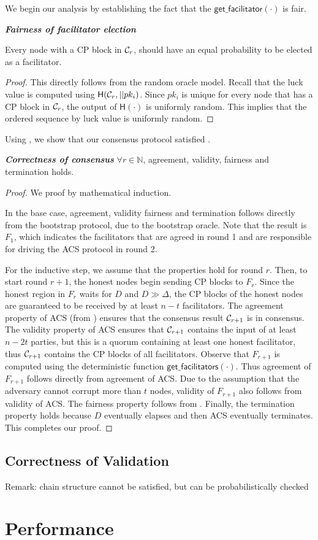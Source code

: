 We begin our analysis by establishing the fact that the $\textsf{get\_facilitator}(\cdot)$ is fair.
\begin{lemma}
\label{lemma:fairness}
\textbf{\emph{Fairness of facilitator election}}

Every node with a CP block in $\mathcal{C}_r$, should have an equal probability to be elected as a facilitator.
\end{lemma}
\begin{proof}
This directly follows from the random oracle model.
Recall that the luck value is computed using $\textsf{H}(\mathcal{C}_r, || pk_i)$.
Since $pk_i$ is unique for every node that has a CP block in $\mathcal{C}_r$, the output of $\textsf{H}(\cdot)$ is uniformly random.
This implies that the ordered sequence by luck value is uniformly random.
\end{proof}


Using , we show that our consensus protocol satisfied .
\begin{lemma}
\textbf{\emph{Correctness of consensus}}
$\forall r \in \mathbb{N}$, agreement, validity, fairness and termination holds.
\end{lemma}

\begin{proof}
We proof by mathematical induction.

In the base case, agreement, validity fairness and termination follows directly from the bootstrap protocol, due to the bootstrap oracle.
Note that the result is $F_1$, which indicates the facilitators that are agreed in round 1 and are responsible for driving the ACS protocol in round 2.

For the inductive step, we assume that the properties hold for round $r$.
Then, to start round $r + 1$, the honest nodes begin sending CP blocks to $F_r$. %
Since the honest region in $F_r$ waits for $D$ and $D \gg \Delta$,
the CP blocks of the honest nodes are guaranteed to be received by at least $n - t$ facilitators.
The agreement property of ACS (from ) ensures that the consensus result $\mathcal{C}_{r + 1}$ is in consensus. 
The validity property of ACS ensures that $\mathcal{C}_{r + 1}$ contains the input of at least $n - 2t$ parties, but this is a quorum containing at least one honest facilitator,
thus $\mathcal{C}_{r + 1}$ contains the CP blocks of all facilitators.
Observe that $F_{r + 1}$ is computed using the deterministic function $\textsf{get\_facilitators}(\cdot)$.
Thus agreement of $F_{r + 1}$ follows directly from agreement of ACS.
Due to the assumption that the adversary cannot corrupt more than $t$ nodes,
validity of $F_{r + 1}$ also follows from validity of ACS.
The fairness property follows from .
Finally, the termination property holds because $D$ eventually elapses and then ACS eventually terminates.
This completes our proof.


\end{proof}


\subsection{Correctness of Validation}

Remark: chain structure cannot be satisfied, but can be probabilistically checked

\section{Performance}